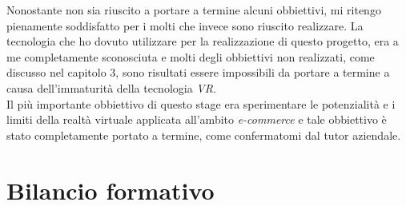 Nonostante non sia riuscito a portare a termine alcuni obbiettivi, mi ritengo pienamente soddisfatto per i molti che invece sono riuscito realizzare. La tecnologia che ho dovuto utilizzare per la realizzazione di questo progetto, era a me completamente sconosciuta e molti degli obbiettivi non realizzati, come discusso nel capitolo 3, sono risultati essere impossibili da portare a termine a causa dell'immaturità della tecnologia \textit{VR}. \\ 
Il più importante obbiettivo di questo stage era sperimentare le potenzialità e i limiti della realtà virtuale applicata all'ambito \textit{e-commerce} e tale obbiettivo è stato completamente portato a termine, come confermatomi dal tutor aziendale.

\section{Bilancio formativo}

